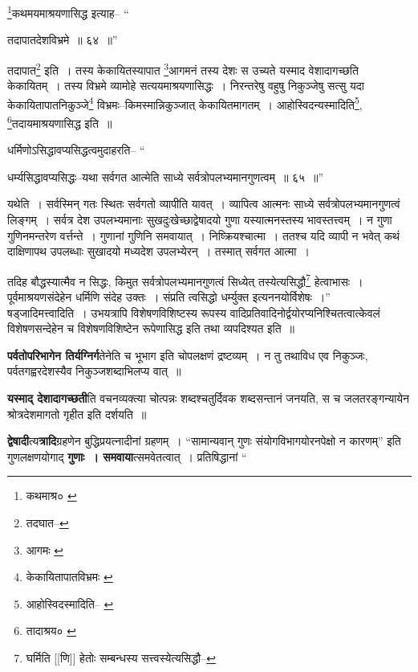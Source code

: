 \documentclass[article,12pt,a4paper]{memoir}
\begin{document}
	\footnote{कथमाश्र० \cite{dp-msA} \cite{dp-msB} \cite{dp-edP} \cite{dp-edH} \cite{dp-edE}}\-कथमयमाश्रयणासिद्ध इत्याह-- “
	  
	तदापातदेशविभ्रमे ॥ ६४ ॥” 
	  
	तदापात\footnote{तदघात--\cite{dp-msA}} इति । तस्य केकायितस्यापात \footnote{आगमः \cite{dp-msC}}\-आगमनं तस्य देशः स उच्यते यस्माद वेशादागच्छति केकायितम् । तस्य विभ्रमे व्यामोहे सत्ययमाश्रयणासिद्धः । निरन्तरेषु वहुषु निकुञ्जेषु सत्सु यदा केकायितापातनिकुञ्जे\footnote{केकायितापातविभ्रमः \cite{dp-msA} \cite{dp-edP} \cite{dp-edH}} विभ्रमः--किमस्मान्निकुञ्जात् केकायितमागतम् । आहोस्विदन्यस्मादिति\footnote{आहोस्विदस्मादिति--\cite{dp-msA} \cite{dp-edP} \cite{dp-edH} \cite{dp-edN}}\-, \footnote{तादाश्रय० \cite{dp-msA} \cite{dp-msB} \cite{dp-edP} \cite{dp-edH} \cite{dp-edE} \cite{dp-edN}}\-तदायमाश्रयणासिद्ध इति ॥ 
	  
	धर्मिणोऽसिद्धावप्यसिद्धत्वमुदाहरति-- “
	  
	धर्म्यसिद्धावप्यसिद्धः--यथा सर्वगत आत्मेति साध्ये सर्वत्रोपलभ्यमानगुणत्वम् ॥ ६५ ॥” 
	  
	यथेति । सर्वस्मिन् गतः स्थितः सर्वगतो व्यापीति यावत् । व्यापित्व आत्मनः साध्ये सर्वत्रोपलभ्यमानगुणत्वं लिङ्गम् । सर्वत्र देश उपलभ्यमानाः सुखदुःखेच्छाद्वेषादयो गुणा यस्यात्मनस्तस्य भावस्तत्त्वम् । न गुणा गुणिनमन्तरेण वर्त्तन्ते । गुणानां गुणिनि समवायात् । निष्क्रियश्चात्मा । ततश्च यदि व्यापी न भवेत् कथं दाक्षिणापथ उपलब्धाः सुखादयो मध्यदेश उपलभ्येरन् । तस्मात् सर्वगत आत्मा । 
	  
	तदिह बौद्धस्यात्मैव न सिद्धः, किमुत सर्वत्रोपलभ्यमानगुणत्वं सिध्येत् तस्येत्यसिद्धौ\footnote{घर्मिति [[णि]] हेतोः सम्बन्धस्य सत्त्वस्येत्यसिद्धौ--\cite{dp-msD-n}} हेत्वाभासः । पूर्वमाश्रयणसंदेहेन धर्मिणि संदेह उक्तः । संप्रति त्वसिद्धो धर्म्युक्त इत्यननयोर्विशेषः ।” षड्जादिमत्त्वादिति । उभयत्रापि विशेषणविशिष्टस्य रूपस्य वादिप्रतिवादिनोर्द्वयोरप्यनिश्चितत्वात्केवलं विशेषणसन्देहेन च विशेषणविशिष्टेन रूपेणासिद्ध इति तथा व्यपदिश्यत इति ॥
	\pend
      

	  \pstart \textbf{पर्वतोपरिभागेन तिर्यग्निर्ग}तेनेति च भूभाग इति चोपलक्षणं द्रष्टव्यम् । न तु तथाविध एव निकुञ्जः, पर्वतगह्वरदेशस्यैव निकुञ्जशब्दाभिलप्य वात् ॥
	\pend
      

	  \pstart \textbf{यस्माद् देशादागच्छती}ति वचनव्यक्त्या चोत्पन्नः शब्दश्चतुर्दिवक शब्दसन्तानं जनयति, स च जलतरङ्गन्यायेन श्रोत्रदेशमागतो गृहीत इति दर्शयति ॥
	\pend
      

	  \pstart \textbf{द्वेषादी}त्य\textbf{त्रादि}ग्रहणेन बुद्धिप्रयत्नादीनां ग्रहणम् । “सामान्यवान् गुणः संयोगविभागयोरनपेक्षो न कारणम्” इति गुणलक्षणयोगाद् \textbf{गुणाः । समवाया}त्समवेतत्वात् । प्रतिषिद्धानां  \leavevmode{} “
	  
\end{document}
